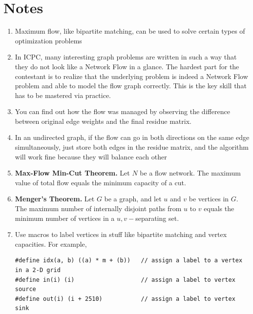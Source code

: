 \documentclass[12pt]{book}
\begin{document}
\section{Notes}
\begin{enumerate}[label = \roman*.]
\item Maximum flow, like bipartite matching, can be used to solve certain types of optimization problems
\item In ICPC, many interesting graph problems are written in such a way that they do not look like a Network Flow in a glance. The hardest part for the contestant is to realize that the underlying problem is indeed a Network Flow problem and able to model the flow graph correctly. This is the key skill that has to be mastered via practice.
\item You can find out how the flow was managed by observing the difference between original edge weights and the final residue matrix.
\item In an undirected graph, if the flow can go in both directions on the same edge simultaneously, just store both edges in the residue matrix, and the algorithm will work fine because they will balance each other
\item \textbf{Max-Flow Min-Cut Theorem. } Let $N$ be a flow network. The maximum value of total flow equals the minimum capacity of a cut.
\item \textbf{Menger's Theorem. } Let $G$ be a graph, and let $u$ and $v$ be vertices in $G$. The maximum number of internally disjoint paths from $u$ to $v$ equals the minimum number of vertices in a $u, v-$separating set.
\item Use macros to label vertices in stuff like bipartite matching and vertex capacities. For example,
\begin{verbatim}
#define idx(a, b) ((a) * m + (b))	// assign a label to a vertex in a 2-D grid
#define in(i) (i)					// assign a label to vertex source
#define out(i) (i + 2510)			// assign a label to vertex sink
\end{verbatim}
\end{enumerate}
\end{document}
